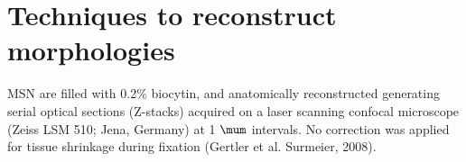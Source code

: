 \section{Techniques to reconstruct morphologies}
\label{sec:morphology-reconstruct}

MSN are filled with 0.2\% biocytin, and anatomically reconstructed generating
serial optical sections (Z-stacks) acquired on a laser scanning confocal
microscope (Zeiss LSM 510; Jena, Germany) at 1 $\mum$ intervals. No correction
was applied for tissue shrinkage during fixation (Gertler et al. Surmeier, 2008).



